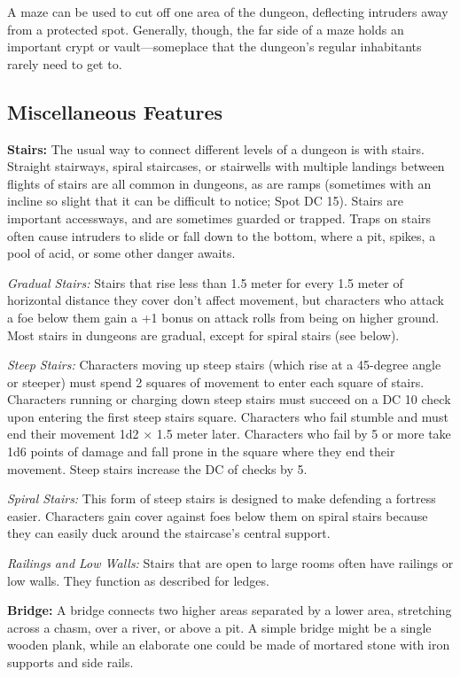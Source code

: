 A maze can be used to cut off one area of the dungeon, deflecting intruders away from a protected spot. Generally, though, the far side of a maze holds an important crypt or vault---someplace that the dungeon's regular inhabitants rarely need to get to.

\subsection{Miscellaneous Features}

\textbf{Stairs:} The usual way to connect different levels of a dungeon is with stairs. Straight stairways, spiral staircases, or stairwells with multiple landings between flights of stairs are all common in dungeons, as are ramps (sometimes with an incline so slight that it can be difficult to notice; Spot DC 15). Stairs are important accessways, and are sometimes guarded or trapped. Traps on stairs often cause intruders to slide or fall down to the bottom, where a pit, spikes, a pool of acid, or some other danger awaits.

\textit{Gradual Stairs:} Stairs that rise less than 1.5 meter for every 1.5 meter of horizontal distance they cover don't affect movement, but characters who attack a foe below them gain a +1 bonus on attack rolls from being on higher ground. Most stairs in dungeons are gradual, except for spiral stairs (see below).

\textit{Steep Stairs:} Characters moving up steep stairs (which rise at a 45-degree angle or steeper) must spend 2 squares of movement to enter each square of stairs. Characters running or charging down steep stairs must succeed on a DC 10  check upon entering the first steep stairs square. Characters who fail stumble and must end their movement 1d2 $\times$ 1.5 meter later. Characters who fail by 5 or more take 1d6 points of damage and fall prone in the square where they end their movement. Steep stairs increase the DC of  checks by 5.

\textit{Spiral Stairs:} This form of steep stairs is designed to make defending a fortress easier. Characters gain cover against foes below them on spiral stairs because they can easily duck around the staircase's central support.

\textit{Railings and Low Walls:} Stairs that are open to large rooms often have railings or low walls. They function as described for ledges.

\textbf{Bridge:} A bridge connects two higher areas separated by a lower area, stretching across a chasm, over a river, or above a pit. A simple bridge might be a single wooden plank, while an elaborate one could be made of mortared stone with iron supports and side rails.

